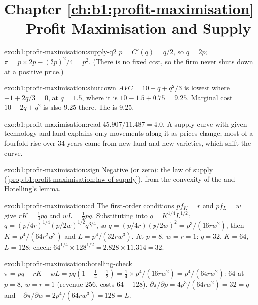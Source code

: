 \section*{Chapter \ref{ch:b1:profit-maximisation} --- Profit Maximisation and Supply}

\begin{solution}{exo:b1:profit-maximisation:supply-q2}
$p = C'(q) = q/2$, so $q = 2p$; $\pi = p \times 2p - (2p)^2/4 = p^2$. (There is no fixed
cost, so the firm never shuts down at a positive price.)
\end{solution}

\begin{solution}{exo:b1:profit-maximisation:shutdown}
$AVC = 10 - q + q^2/3$ is lowest where $-1 + 2q/3 = 0$, at $q = 1.5$, where it is
$10 - 1.5 + 0.75 = 9.25$. Marginal cost $10 - 2q + q^2$ is also $9.25$ there. The
 is 9.25.
\end{solution}

\begin{solution}{exo:b1:profit-maximisation:read}
$45.907/11.487 = 4.0$. A supply curve with given technology and land
explains only movements along it as prices change; most of a fourfold rise
over 34 years came from new land and new varieties, which shift the curve.
\end{solution}

\begin{solution}{exo:b1:profit-maximisation:sign}
Negative (or zero): the law of supply
(\cref{prop:b1:profit-maximisation:law-of-supply}), from the convexity of the
 and Hotelling's lemma.
\end{solution}

\begin{solution}{exo:b1:profit-maximisation:cd}
The first-order conditions $p f_K = r$ and $pf_L = w$ give $rK = \tfrac14pq$ and
$wL = \tfrac12pq$. Substituting into $q = K^{1/4}L^{1/2}$:
$q = (p/4r)^{1/4}(p/2w)^{1/2}q^{3/4}$, so $q = (p/4r)(p/2w)^2 = p^3/(16rw^2)$, then
$K = p^4/(64r^2w^2)$ and $L = p^4/(32rw^3)$. At $p = 8$, $w = r = 1$: $q = 32$, $K = 64$,
$L = 128$; check: $64^{1/4} \times 128^{1/2} = 2.828 \times 11.314 = 32$.
\end{solution}

\begin{solution}{exo:b1:profit-maximisation:hotelling-check}
$\pi = pq - rK - wL = pq(1 - \tfrac14 - \tfrac12) = \tfrac14 \times p^4/(16rw^2) = p^4/(64rw^2)$:
64 at $p = 8$, $w = r = 1$ (revenue 256, costs $64 + 128$).
$\partial\pi/\partial p = 4p^3/(64rw^2) = 32 = q$ and
$-\partial\pi/\partial w = 2p^4/(64rw^3) = 128 = L$.
\end{solution}

